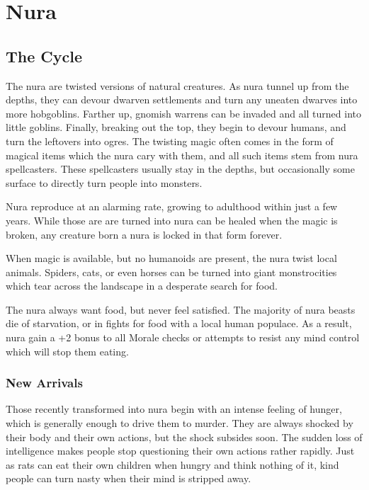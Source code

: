\chapter{Nura}

\label{nura}

\section{The Cycle}

\begin{multicols}{2}

The nura are twisted versions of natural creatures.
As nura tunnel up from the depths, they can devour dwarven settlements and turn any uneaten dwarves into more hobgoblins.
Farther up, gnomish warrens can be invaded and all turned into little goblins.
Finally, breaking out the top, they begin to devour humans, and turn the leftovers into ogres.
The twisting magic often comes in the form of magical items which the nura cary with them, and all such items stem from nura spellcasters.
These spellcasters usually stay in the depths, but occasionally some surface to directly turn people into monsters.

Nura reproduce at an alarming rate, growing to adulthood within just a few years.
While those are are turned into nura can be healed when the magic is broken, any creature born a nura is locked in that form forever.

When magic is available, but no humanoids are present, the nura twist local animals.
Spiders, cats, or even horses can be turned into giant monstrocities which tear across the landscape in a desperate search for food.

The nura always want food, but never feel satisfied.
The majority of nura beasts die of starvation, or in fights for food with a local human populace.
As a result, nura gain a +2 bonus to all Morale checks or attempts to resist any mind control which will stop them eating.

\subsection{New Arrivals}

Those recently transformed into nura begin with an intense feeling of hunger, which is generally enough to drive them to murder.
They are always shocked by their body and their own actions, but the shock subsides soon.
The sudden loss of intelligence makes people stop questioning their own actions rather rapidly.
Just as rats can eat their own children when hungry and think nothing of it, kind people can turn nasty when their mind is stripped away.

\end{multicols}

